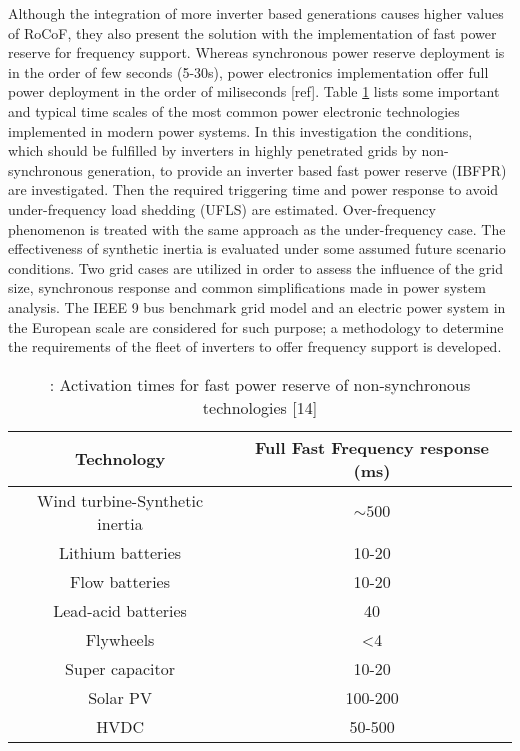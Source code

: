  Although the integration of more inverter based generations causes higher values of RoCoF, they also present the solution with the implementation of fast power reserve for frequency support. Whereas synchronous power reserve deployment is in the order of few seconds (5-30s), power electronics implementation offer full power deployment in the order of miliseconds [ref]. Table \ref{tb:tech_times} lists some important and typical time scales of the most common power electronic technologies implemented in modern power systems. In this investigation the conditions, which should be fulfilled by inverters in highly penetrated grids by non-synchronous generation, to provide an inverter based fast power reserve (IBFPR) are investigated. Then the required triggering time and power response to avoid under-frequency load shedding (UFLS) are estimated. Over-frequency phenomenon is treated with the same approach as the under-frequency case. The effectiveness of synthetic inertia is evaluated under some assumed future scenario conditions. Two grid cases are utilized in order to assess the influence of the grid size, synchronous response and common simplifications made in power system analysis. The IEEE 9 bus benchmark grid model and an electric power system in the European scale are considered for such purpose; a methodology to determine the requirements of the fleet of inverters to offer frequency support is developed.\\
 
\begin{table}[h]
	\caption{\label{tb:tech_times}: Activation times for fast power reserve of non-synchronous technologies [14]}
	\centering
	\begin{tabular}{cc}
		\toprule
		\textbf{Technology} 	& \textbf{ Full Fast Frequency response (ms)}\\
		\midrule
			
		Wind turbine-Synthetic inertia&	$ \sim500 $\\
		Lithium batteries&	10-20\\
		Flow batteries&	10-20\\
		Lead-acid batteries&	40\\
		Flywheels&	<4\\
		Super capacitor&	10-20\\
		Solar PV&	100-200\\
		HVDC&	50-500\\

		\bottomrule
	\end{tabular}
\end{table}
 
